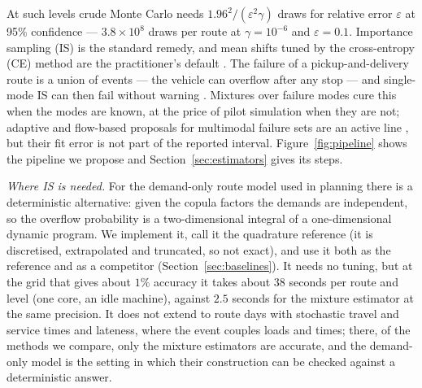 \documentclass[11pt]{article}
\theoremstyle{definition}
\theoremstyle{remark}
\begin{document}
At such levels crude Monte Carlo needs $1.96^2/(\varepsilon^2\gamma)$ draws for
relative error $\varepsilon$ at 95\% confidence --- $3.8\times10^{8}$ draws per
route at $\gamma=10^{-6}$ and $\varepsilon=0.1$. Importance sampling (IS) is the
standard remedy, and mean shifts tuned by the cross-entropy (CE) method are
the practitioner's default \citep{deBoerEtAl2005}. The failure of a
pickup-and-delivery route is a union of events --- the vehicle can overflow
after any stop --- and single-mode IS can then fail without warning
\citep{GlassermanWang1997}. Mixtures over failure modes
\citep{OwenMaximovChertkov2019,KurtzSong2013,GeyerPapaioannouStraub2019} cure
this when the modes are known, at the price of pilot simulation when they are
not; adaptive and flow-based proposals for multimodal failure sets are an
active line \citep{Helal2026Multimodal,Zhang2026GMM,Dasgupta2024REIN}, but
their fit error is not part of the reported interval. Figure~\ref{fig:pipeline}
shows the pipeline we propose and Section~\ref{sec:estimators} gives its steps.

\emph{Where IS is needed.} For the demand-only route model used in planning
there is a deterministic alternative: given the copula factors the demands are
independent, so the overflow probability is a two-dimensional integral of a
one-dimensional dynamic program. We implement it, call it the quadrature
reference (it is discretised, extrapolated and truncated, so not exact), and
use it both as the reference and as a competitor
(Section~\ref{sec:baselines}). It needs no tuning, but at the grid that gives
about $1\%$ accuracy it takes about $38$ seconds per route and level (one core, an idle machine),
against $2.5$ seconds for the mixture estimator at the same precision. It does
not extend to route days with stochastic travel and service times and
lateness, where the event couples loads and times; there, of the methods we
compare, only the mixture estimators are accurate, and the demand-only model
is the setting in which their construction can be checked against a
deterministic answer.
\end{document}
